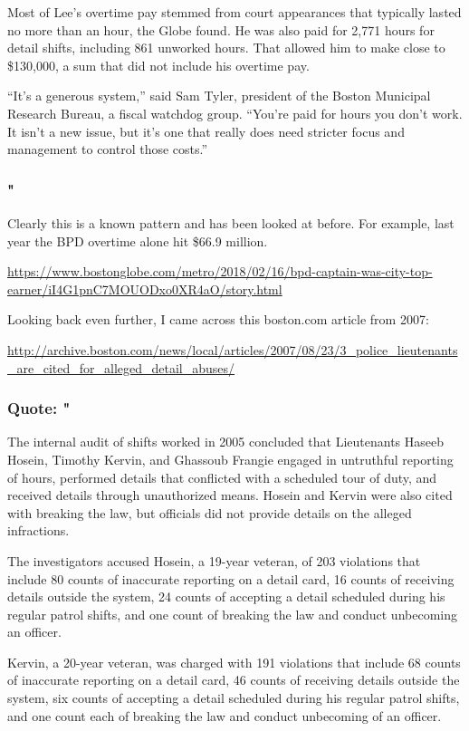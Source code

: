 \documentclass[]{article}
\begin{document}
Most of Lee's overtime pay stemmed from court appearances that typically
lasted no more than an hour, the Globe found. He was also paid for 2,771
hours for detail shifts, including 861 unworked hours. That allowed him
to make close to \$130,000, a sum that did not include his overtime pay.

``It's a generous system,'' said Sam Tyler, president of the Boston
Municipal Research Bureau, a fiscal watchdog group. ``You're paid for
hours you don't work. It isn't a new issue, but it's one that really
does need stricter focus and management to control those costs.''

\subsubsection{"}\label{section}

Clearly this is a known pattern and has been looked at before. For
example, last year the BPD overtime alone hit \$66.9 million.

\url{https://www.bostonglobe.com/metro/2018/02/16/bpd-captain-was-city-top-earner/iI4G1pnC7MOUODxo0XR4aO/story.html}

Looking back even further, I came across this boston.com article from
2007:

\url{http://archive.boston.com/news/local/articles/2007/08/23/3_police_lieutenants_are_cited_for_alleged_detail_abuses/}

\subsubsection{Quote: "}\label{quote-1}

The internal audit of shifts worked in 2005 concluded that Lieutenants
Haseeb Hosein, Timothy Kervin, and Ghassoub Frangie engaged in
untruthful reporting of hours, performed details that conflicted with a
scheduled tour of duty, and received details through unauthorized means.
Hosein and Kervin were also cited with breaking the law, but officials
did not provide details on the alleged infractions.

The investigators accused Hosein, a 19-year veteran, of 203 violations
that include 80 counts of inaccurate reporting on a detail card, 16
counts of receiving details outside the system, 24 counts of accepting a
detail scheduled during his regular patrol shifts, and one count of
breaking the law and conduct unbecoming an officer.

Kervin, a 20-year veteran, was charged with 191 violations that include
68 counts of inaccurate reporting on a detail card, 46 counts of
receiving details outside the system, six counts of accepting a detail
scheduled during his regular patrol shifts, and one count each of
breaking the law and conduct unbecoming of an officer.
\end{document}
